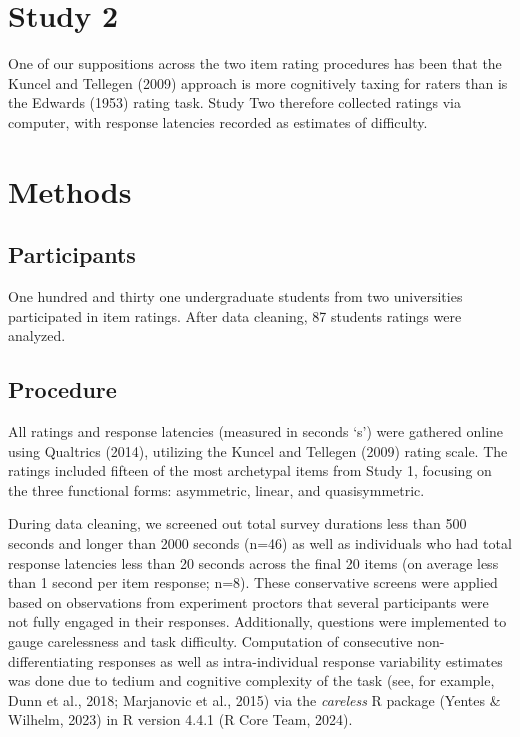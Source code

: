 \documentclass[
  ,jou]{apa6}
\begin{document}
\section{Study 2}\label{study-2}

One of our suppositions across the two item rating procedures has been that the Kuncel and Tellegen (2009) approach is more cognitively taxing for raters than is the Edwards (1953) rating task. Study Two therefore collected ratings via computer, with response latencies recorded as estimates of difficulty.

\section{Methods}\label{methods-1}

\subsection{Participants}\label{participants-1}

One hundred and thirty one undergraduate students from two universities participated in item ratings. After data cleaning, 87 students ratings were analyzed.

\subsection{Procedure}\label{procedure-1}

All ratings and response latencies (measured in seconds `s') were gathered online using Qualtrics (2014), utilizing the Kuncel and Tellegen (2009) rating scale. The ratings included fifteen of the most archetypal items from Study 1, focusing on the three functional forms: asymmetric, linear, and quasisymmetric.

During data cleaning, we screened out total survey durations less than 500 seconds and longer than 2000 seconds (n=46) as well as individuals who had total response latencies less than 20 seconds across the final 20 items (on average less than 1 second per item response; n=8). These conservative screens were applied based on observations from experiment proctors that several participants were not fully engaged in their responses. Additionally, questions were implemented to gauge carelessness and task difficulty. Computation of consecutive non-differentiating responses as well as intra-individual response variability estimates was done due to tedium and cognitive complexity of the task (see, for example, Dunn et al., 2018; Marjanovic et al., 2015) via the \emph{careless} R package (Yentes \& Wilhelm, 2023) in R version 4.4.1 (R Core Team, 2024).
\end{document}
